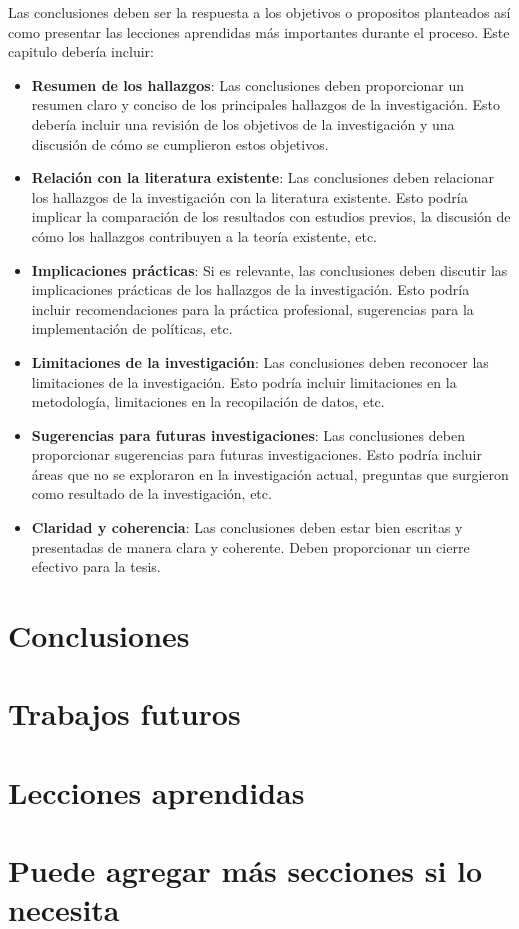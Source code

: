 
Las conclusiones deben ser la respuesta a los objetivos o propositos planteados así como presentar las lecciones aprendidas más importantes durante el proceso. Este capitulo debería incluir: 

\begin{itemize}
\item \textbf{Resumen de los hallazgos}: Las conclusiones deben proporcionar un resumen claro y conciso de los principales hallazgos de la investigación. Esto debería incluir una revisión de los objetivos de la investigación y una discusión de cómo se cumplieron estos objetivos.
\item \textbf{Relación con la literatura existente}: Las conclusiones deben relacionar los hallazgos de la investigación con la literatura existente. Esto podría implicar la comparación de los resultados con estudios previos, la discusión de cómo los hallazgos contribuyen a la teoría existente, etc.
\item \textbf{Implicaciones prácticas}: Si es relevante, las conclusiones deben discutir las implicaciones prácticas de los hallazgos de la investigación. Esto podría incluir recomendaciones para la práctica profesional, sugerencias para la implementación de políticas, etc.
\item \textbf{Limitaciones de la investigación}: Las conclusiones deben reconocer las limitaciones de la investigación. Esto podría incluir limitaciones en la metodología, limitaciones en la recopilación de datos, etc.
\item \textbf{Sugerencias para futuras investigaciones}: Las conclusiones deben proporcionar sugerencias para futuras investigaciones. Esto podría incluir áreas que no se exploraron en la investigación actual, preguntas que surgieron como resultado de la investigación, etc.
\item \textbf{Claridad y coherencia}: Las conclusiones deben estar bien escritas y presentadas de manera clara y coherente. Deben proporcionar un cierre efectivo para la tesis.
\end{itemize}

\section{Conclusiones}

\section{Trabajos futuros}

\section{Lecciones aprendidas}

\section{Puede agregar más secciones si lo necesita}